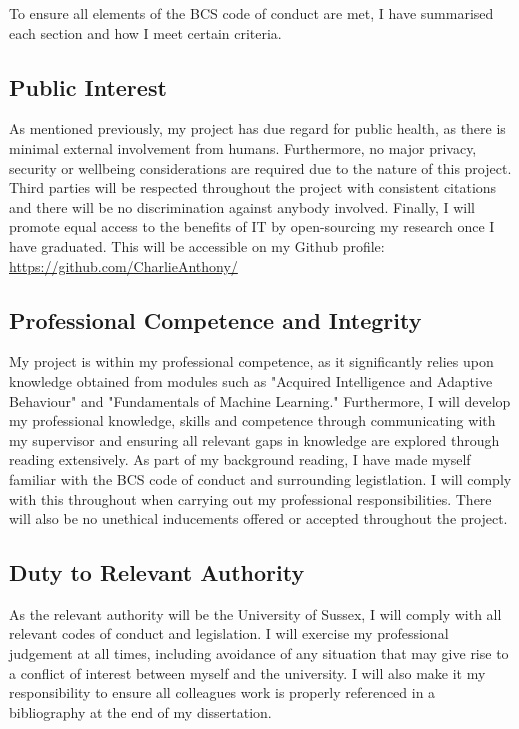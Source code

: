 \documentclass[12pt]{article}
\begin{document}
To ensure all elements of the BCS code of conduct are met, I have summarised each section and how I meet certain criteria. \\
\subsection{Public Interest}
As mentioned previously, my project has due regard for public health, as there is minimal external involvement from humans.
Furthermore, no major privacy, security or wellbeing considerations are required due to the nature of this project. Third parties
will be respected throughout the project with consistent citations and there will be no discrimination against anybody involved.
Finally, I will promote equal access to the benefits of IT by open-sourcing my research once I have graduated. This will be accessible
on my Github profile: \href{https://github.com/CharlieAnthony/}{https://github.com/CharlieAnthony/} \\
\subsection{Professional Competence and Integrity}
My project is within my professional competence, as it significantly relies upon knowledge obtained from modules such as "Acquired
Intelligence and Adaptive Behaviour" and "Fundamentals of Machine Learning." Furthermore, I will develop my professional knowledge,
skills and competence through communicating with my supervisor and ensuring all relevant gaps in knowledge are explored through
reading extensively. As part of my background reading, I have made myself familiar with the BCS code of conduct and surrounding
legistlation. I will comply with this throughout when carrying out my professional responsibilities. There will also
be no unethical inducements offered or accepted throughout the project. \\
\subsection{Duty to Relevant Authority}
As the relevant authority will be the University of Sussex, I will comply with all relevant codes of conduct and legislation. I
will exercise my professional judgement at all times, including avoidance of any situation that may give rise to a conflict of
interest between myself and the university. I will also make it my responsibility to ensure all colleagues work is properly
referenced in a bibliography at the end of my dissertation. \\
\end{document}
